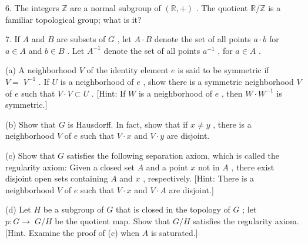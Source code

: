 \documentclass[10pt]{article}
\begin{document}
6. The integers \(\mathbb{Z}\) are a normal subgroup of \(\left( {\mathbb{R}, + }\right)\) . The quotient \(\mathbb{R}/\mathbb{Z}\) is a familiar topological group; what is it?

7. If \(A\) and \(B\) are subsets of \(G\) , let \(A \cdot  B\) denote the set of all points \(a \cdot  b\) for \(a \in  A\) and \(b \in  B\) . Let \({A}^{-1}\) denote the set of all points \({a}^{-1}\) , for \(a \in  A\) .

(a) A neighborhood \(V\) of the identity element \(e\) is said to be symmetric if \(V = \; {V}^{-1}\) . If \(U\) is a neighborhood of \(e\) , show there is a symmetric neighborhood \(V\) of \(e\) such that \(V \cdot  V \subset  U\) . [Hint: If \(W\) is a neighborhood of \(e\) , then \(W \cdot  {W}^{-1}\) is symmetric.]

(b) Show that \(G\) is Hausdorff. In fact, show that if \(x \neq  y\) , there is a neighborhood \(V\) of \(e\) such that \(V \cdot  x\) and \(V \cdot  y\) are disjoint.

(c) Show that \(G\) satisfies the following separation axiom, which is called the regularity axiom: Given a closed set \(A\) and a point \(x\) not in \(A\) , there exist disjoint open sets containing \(A\) and \(x\) , respectively. [Hint: There is a neighborhood \(V\) of \(e\) such that \(V \cdot  x\) and \(V \cdot  A\) are disjoint.]

(d) Let \(H\) be a subgroup of \(G\) that is closed in the topology of \(G\) ; let \(p : G \rightarrow \; G/H\) be the quotient map. Show that \(G/H\) satisfies the regularity axiom. [Hint. Examine the proof of (c) when \(A\) is saturated.]
\end{document}
